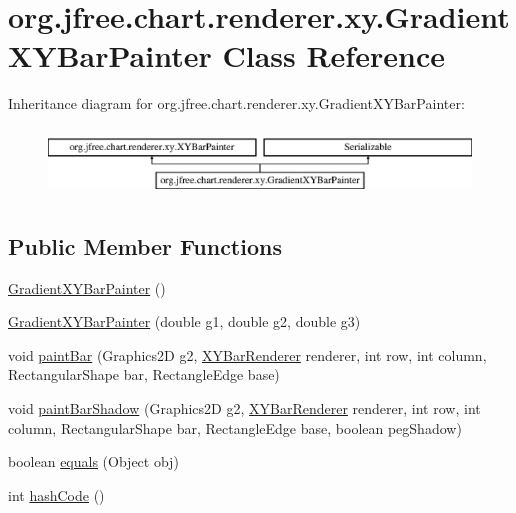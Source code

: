 \hypertarget{classorg_1_1jfree_1_1chart_1_1renderer_1_1xy_1_1_gradient_x_y_bar_painter}{}\section{org.\+jfree.\+chart.\+renderer.\+xy.\+Gradient\+X\+Y\+Bar\+Painter Class Reference}
\label{classorg_1_1jfree_1_1chart_1_1renderer_1_1xy_1_1_gradient_x_y_bar_painter}
Inheritance diagram for org.\+jfree.\+chart.\+renderer.\+xy.\+Gradient\+X\+Y\+Bar\+Painter\+:\begin{figure}[H]
\begin{center}
\leavevmode
\includegraphics[height=1.848185cm]{classorg_1_1jfree_1_1chart_1_1renderer_1_1xy_1_1_gradient_x_y_bar_painter}
\end{center}
\end{figure}
\subsection*{Public Member Functions}
\begin{DoxyCompactItemize}
\item 
\mbox{\hyperlink{classorg_1_1jfree_1_1chart_1_1renderer_1_1xy_1_1_gradient_x_y_bar_painter_a2479d3d72c05c84c5d0829ac4663be0b}{Gradient\+X\+Y\+Bar\+Painter}} ()
\item 
\mbox{\hyperlink{classorg_1_1jfree_1_1chart_1_1renderer_1_1xy_1_1_gradient_x_y_bar_painter_a664fa0f1f8b02f499fc6640bd44565cd}{Gradient\+X\+Y\+Bar\+Painter}} (double g1, double g2, double g3)
\item 
void \mbox{\hyperlink{classorg_1_1jfree_1_1chart_1_1renderer_1_1xy_1_1_gradient_x_y_bar_painter_a2d47e2287eb1a9ef1cab6e17497679e7}{paint\+Bar}} (Graphics2D g2, \mbox{\hyperlink{classorg_1_1jfree_1_1chart_1_1renderer_1_1xy_1_1_x_y_bar_renderer}{X\+Y\+Bar\+Renderer}} renderer, int row, int column, Rectangular\+Shape bar, Rectangle\+Edge base)
\item 
void \mbox{\hyperlink{classorg_1_1jfree_1_1chart_1_1renderer_1_1xy_1_1_gradient_x_y_bar_painter_ab7af0a3da12e9b4a0007982ebde3db91}{paint\+Bar\+Shadow}} (Graphics2D g2, \mbox{\hyperlink{classorg_1_1jfree_1_1chart_1_1renderer_1_1xy_1_1_x_y_bar_renderer}{X\+Y\+Bar\+Renderer}} renderer, int row, int column, Rectangular\+Shape bar, Rectangle\+Edge base, boolean peg\+Shadow)
\item 
boolean \mbox{\hyperlink{classorg_1_1jfree_1_1chart_1_1renderer_1_1xy_1_1_gradient_x_y_bar_painter_a299bdd82aa1db078018759a7fa21608f}{equals}} (Object obj)
\item 
int \mbox{\hyperlink{classorg_1_1jfree_1_1chart_1_1renderer_1_1xy_1_1_gradient_x_y_bar_painter_a298b62760d6bfa5977acd482235ecf79}{hash\+Code}} ()
\end{DoxyCompactItemize}


